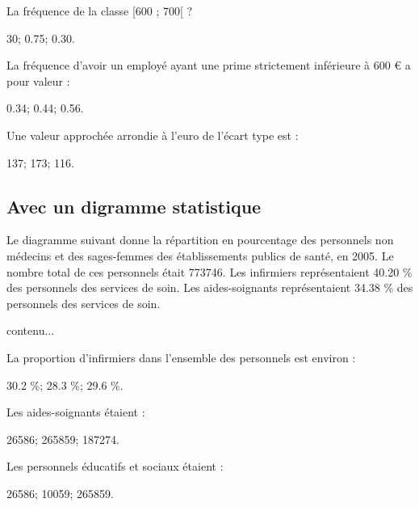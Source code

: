 \begin{questions}
	\question La fréquence de la classe [600 ; 700[ ?
	
	\begin{oneparchoices}
		\choice \num{30};
		\choice \num{0.75};
		\CorrectChoice \num{0.30}.
	\end{oneparchoices} 

	\question La fréquence d'avoir un employé ayant une prime strictement inférieure à 600 € a pour valeur :
	
	\begin{oneparchoices}
		\choice \num{0.34};
		\CorrectChoice \num{0.44};
		\choice \num{0.56}.
	\end{oneparchoices} 

	\question Une valeur approchée arrondie à l'euro de l'écart type est :
	
	\begin{oneparchoices}
		\choice \num{137};
		\choice \num{173};
		\CorrectChoice \num{116}.
	\end{oneparchoices} 
\end{questions}  

\subsection{Avec un digramme statistique}

Le diagramme suivant donne la répartition en pourcentage des personnels non médecins et des sages-femmes des établissements publics de santé, en 2005.
Le nombre total de ces personnels était \num{773746}.
Les infirmiers représentaient \num{40.20} \% des personnels des services de soin. Les aides-soignants représentaient \num{34.38} \% des personnels des services de soin.



\begin{center}
	contenu...
\end{center}

\begin{questions}
	\question La proportion d'infirmiers dans l'ensemble des personnels est environ :
	
	\begin{oneparchoices}
		\choice \num{30.2} \%;
		\CorrectChoice \num{28.3} \%;
		\choice \num{29.6} \%.
		
	\end{oneparchoices} 

	\question Les aides-soignants étaient :
	
	\begin{oneparchoices}
		\choice \num{26586};
		\choice \num{265859};
		\CorrectChoice \num{187274}.
		
	\end{oneparchoices} 

	\question Les personnels éducatifs et sociaux étaient :
	
	\begin{oneparchoices}
		\choice \num{26586};
		\CorrectChoice \num{10059};
		\choice \num{265859}.
		
	\end{oneparchoices} 
\end{questions}